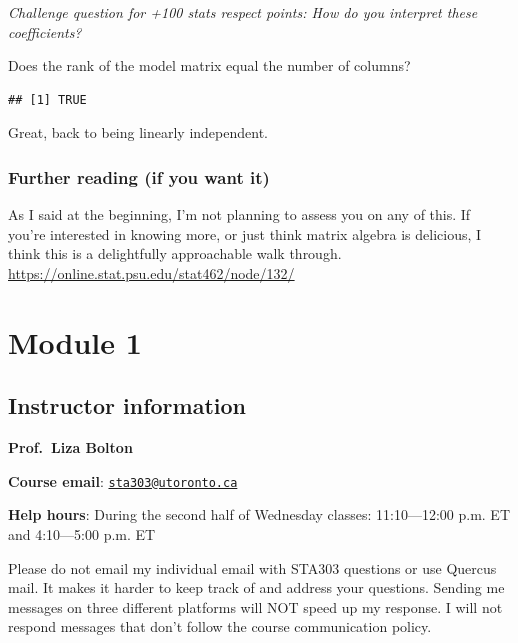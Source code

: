 \documentclass[
]{book}
\newenvironment{Shaded}{\begin{snugshade}}{\end{snugshade}}
\newcommand{\FunctionTok}[1]{\textcolor[rgb]{0.00,0.00,0.00}{#1}}
\newcommand{\NormalTok}[1]{#1}
\newcommand{\SpecialCharTok}[1]{\textcolor[rgb]{0.00,0.00,0.00}{#1}}
\begin{document}
\emph{Challenge question for +100 stats respect points: How do you interpret these coefficients?}

Does the rank of the model matrix equal the number of columns?

\begin{Shaded}
\end{Shaded}

\begin{verbatim}
## [1] TRUE
\end{verbatim}

Great, back to being linearly independent.

\hypertarget{further-reading-if-you-want-it}{%
\subsection{Further reading (if you want it)}\label{further-reading-if-you-want-it}}

As I said at the beginning, I'm not planning to assess you on any of this. If you're interested in knowing more, or just think matrix algebra is delicious, I think this is a delightfully approachable walk through. \url{https://online.stat.psu.edu/stat462/node/132/}

\hypertarget{module-1}{%
\chapter{Module 1}\label{module-1}}

\hypertarget{instructor-information}{%
\section{Instructor information}\label{instructor-information}}

\textbf{Prof.~Liza Bolton}

\textbf{Course email}: \href{mailto:sta303@utoronto.ca}{\nolinkurl{sta303@utoronto.ca}}

\textbf{Help hours}: During the second half of Wednesday classes: 11:10---12:00 p.m. ET and 4:10---5:00 p.m. ET

Please do not email my individual email with STA303 questions or use Quercus mail. It makes it harder to keep track of and address your questions. Sending me messages on three different platforms will NOT speed up my response. I will not respond messages that don't follow the course communication policy.
\end{document}
